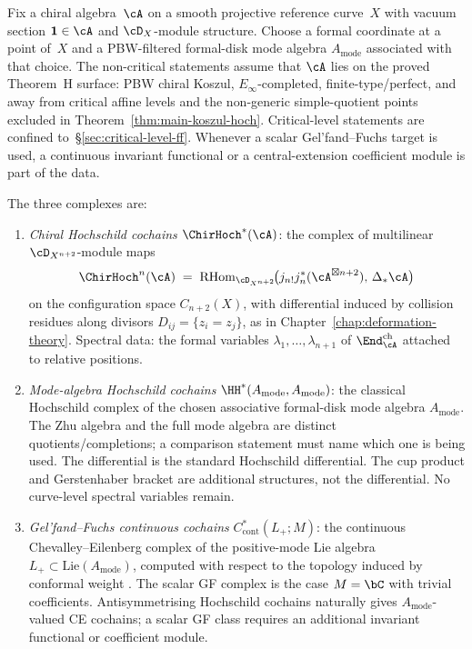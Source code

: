 Fix a chiral algebra~$\cA$ on a smooth projective reference curve~$X$
with vacuum section $\mathbf{1}\in\cA$ and $\cD_X$-module structure.
Choose a formal coordinate at a point of~$X$ and a PBW-filtered
formal-disk mode algebra $A_{\mathrm{mode}}$ associated with that
choice. The non-critical statements assume that $\cA$ lies on the
proved Theorem~H surface: PBW chiral Koszul, $E_\infty$-completed,
finite-type/perfect, and away from critical affine levels and the
non-generic simple-quotient points excluded in
Theorem~\ref{thm:main-koszul-hoch}. Critical-level statements are
confined to~\S\ref{sec:critical-level-ff}. Whenever a scalar
Gel'fand--Fuchs target is used, a continuous invariant functional or a
central-extension coefficient module is part of the data.

\begin{definition}
\label{def:three-hochschild-complexes}
The three complexes are:
\begin{enumerate}[label=\textup{(\roman*)}]
\item \emph{Chiral Hochschild cochains} $\ChirHoch^*(\cA)$: the
 complex of multilinear
 $\cD_{X^{n+2}}$-module maps
 \[
 \ChirHoch^n(\cA) \;=\;
 \mathrm{RHom}_{\cD_{X^{n+2}}}\!\bigl(j_{n!}j_n^*(\cA^{\boxtimes n+2}),\,
 \Delta_*\cA\bigr)
 \]
 on the configuration space $C_{n+2}(X)$, with differential induced
 by collision residues along divisors $D_{ij}=\{z_i=z_j\}$, as in
 Chapter~\ref{chap:deformation-theory}. Spectral data: the formal
 variables $\lambda_1,\ldots,\lambda_{n+1}$ of $\End^{\mathrm{ch}}_\cA$
 attached to relative positions.
\item \emph{Mode-algebra Hochschild cochains}
 $\HH^*(A_{\mathrm{mode}},A_{\mathrm{mode}})$: the classical Hochschild
 complex of the chosen associative formal-disk mode algebra
 $A_{\mathrm{mode}}$. The Zhu algebra and the full mode algebra are
 distinct quotients/completions; a comparison statement must name which
 one is being used. The differential is the standard Hochschild
 differential. The cup product and Gerstenhaber bracket are additional
 structures, not the differential. No curve-level spectral variables
 remain.
\item \emph{Gel'fand--Fuchs continuous cochains}
 $C^*_{\mathrm{cont}}(L_+;M)$: the continuous
 Chevalley--Eilenberg complex of the positive-mode Lie algebra
 $L_+\subset \mathrm{Lie}(A_{\mathrm{mode}})$, computed with respect
 to the topology induced by conformal weight
 \cite{Fuks86,Goncharova73}. The scalar GF complex is the case
 $M=\bC$ with trivial coefficients. Antisymmetrising Hochschild
 cochains naturally gives $A_{\mathrm{mode}}$-valued CE cochains; a
 scalar GF class requires an additional invariant functional or
 coefficient module.
\end{enumerate}
\end{definition}

